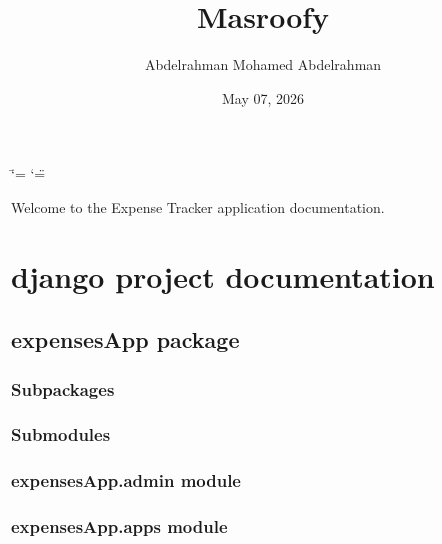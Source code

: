 \documentclass[letterpaper,10pt,english]{sphinxmanual}
\title{Masroofy}
\date{May 07, 2026}
\author{Abdelrahman Mohamed Abdelrahman}
\begin{document}
\ifdefined\shorthandoff
  \ifnum\catcode`\=\string=\active\shorthandoff{=}\fi
  \ifnum\catcode`\"=\active{}\fi
\fi

\pagestyle{empty}
\sphinxmaketitle
\pagestyle{plain}
\sphinxtableofcontents
\pagestyle{normal}
\label{\detokenize{index::doc}}


\sphinxAtStartPar
Welcome to the Expense Tracker application documentation.

\sphinxstepscope


\chapter{django project documentation}
\label{\detokenize{modules:django-project-documentation}}\label{\detokenize{modules::doc}}
\sphinxstepscope


\section{expensesApp package}
\label{\detokenize{expensesApp:expensesapp-package}}\label{\detokenize{expensesApp::doc}}

\subsection{Subpackages}
\label{\detokenize{expensesApp:subpackages}}

\subsection{Submodules}
\label{\detokenize{expensesApp:submodules}}

\subsection{expensesApp.admin module}
\label{\detokenize{expensesApp:module-expensesApp.admin}}\label{\detokenize{expensesApp:expensesapp-admin-module}}

\subsection{expensesApp.apps module}
\label{\detokenize{expensesApp:module-expensesApp.apps}}\label{\detokenize{expensesApp:expensesapp-apps-module}}
\end{document}
